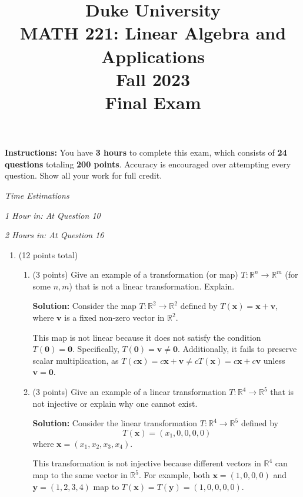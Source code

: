 \documentclass[12pt]{article}
\title{
    \vspace{4cm}
    \textbf{\LARGE Duke University} \\
    \vspace{0.5cm}
    \textbf{\Large MATH 221: Linear Algebra and Applications} \\
    \vspace{0.5cm}
    \textbf{Fall 2023} \\
    \vspace{0.5cm}
    \textbf{\Large Final Exam} \\
    \vspace{0.5cm}
}
\date{}
\newcommand{\qspace}{\vspace{1em}} %
\newenvironment{solution}{\noindent\textbf{Solution:} }{\qspace}
\begin{document}
\maketitle

\textbf{Instructions:} You have \textbf{3 hours} to complete this exam, which consists of \textbf{24 questions} totaling \textbf{200 points}. Accuracy is encouraged over attempting every question. Show all your work for full credit. 

\textit{Time Estimations}

\textit{1 Hour in: At Question 10}

\textit{2 Hours in: At Question 16}

\newpage

\begin{enumerate}

    \item (12 points total)
    \begin{enumerate}
    \item (3 points) Give an example of a transformation (or map) \( T: \mathbb{R}^n \to \mathbb{R}^m \) (for some \( n, m \)) that is not a linear transformation. Explain.
    
    \begin{solution}
    Consider the map \( T: \mathbb{R}^2 \to \mathbb{R}^2 \) defined by \( T(\mathbf{x}) = \mathbf{x} + \mathbf{v} \), where \( \mathbf{v} \) is a fixed non-zero vector in \( \mathbb{R}^2 \). 

    This map is not linear because it does not satisfy the condition \( T(\mathbf{0}) = \mathbf{0} \). Specifically, \( T(\mathbf{0}) = \mathbf{v} \neq \mathbf{0} \). Additionally, it fails to preserve scalar multiplication, as \( T(c\mathbf{x}) = c\mathbf{x} + \mathbf{v} \neq cT(\mathbf{x}) = c\mathbf{x} + c\mathbf{v} \) unless \( \mathbf{v} = \mathbf{0} \).
    \end{solution}
    
    \item (3 points) Give an example of a linear transformation \( T: \mathbb{R}^4 \to \mathbb{R}^5 \) that is not injective or explain why one cannot exist.
    
    \begin{solution}
    Consider the linear transformation \( T: \mathbb{R}^4 \to \mathbb{R}^5 \) defined by
\[
T(\mathbf{x}) = (x_1, 0, 0, 0, 0)
\]
where \( \mathbf{x} = (x_1, x_2, x_3, x_4) \).

This transformation is not injective because different vectors in \( \mathbb{R}^4 \) can map to the same vector in \( \mathbb{R}^5 \). For example, both \( \mathbf{x} = (1, 0, 0, 0) \) and \( \mathbf{y} = (1, 2, 3, 4) \) map to \( T(\mathbf{x}) = T(\mathbf{y}) = (1, 0, 0, 0, 0) \). 


\end{solution}
\end{enumerate}
\end{enumerate}
\end{document}
